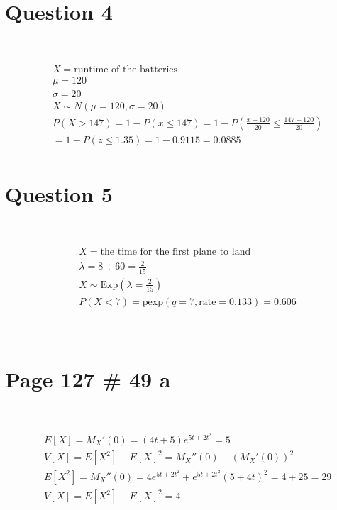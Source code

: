 \documentclass{article}
\begin{document}
\newpage

\section*{Question 4}

~

\begin{align*}
    &X=\text{runtime of the batteries}\\
    &\mu=120\\
    &\sigma=20\\
    &X\sim N(\mu=120,\sigma=20)\\
    &P(X>147)=1-P(x\leqslant147)=1-P(\frac{x-120}{20}\leqslant\frac{147-120}{20})\\
    &=1-P(z\leqslant 1.35)=1-0.9115=0.0885\\
\end{align*}

\newpage

\section*{Question 5}

~

\begin{align*}
    &X=\text{the time for the first plane to land}\\
    &\lambda=8\div 60=\frac{2}{15}\\
    &X\sim \text{Exp}(\lambda=\frac{2}{15})\\
    &P(X<7)=\text{pexp}(q=7,\text{rate}=0.133)=0.606\\
\end{align*}

~

\newpage

\section*{Page 127 \# 49 a}

~

\begin{align*}
    &E[X]={M_X}'(0)=(4t+5)e^{5t+2t^2}=5\\
    &V[X]=E[X^2]-E[X]^2={M_X}''(0)-({M_X}'(0))^2\\
    &E[X^2]={M_X}''(0)=4e^{5t+2t^2}+e^{5t+2t^2}(5+4t)^2=4+25=29\\
    &V[X]=E[X^2]-E[X]^2=4\\
\end{align*}
\end{document}
